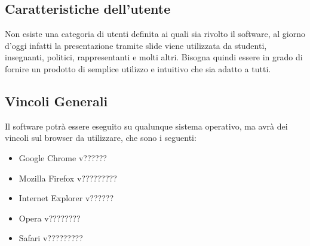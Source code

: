 \subsection{Caratteristiche dell'utente}
Non esiste una categoria di utenti definita ai quali sia rivolto il software, al giorno d'oggi infatti la presentazione tramite slide viene utilizzata da studenti, insegnanti, politici, rappresentanti e molti altri. Bisogna quindi essere in grado di fornire un prodotto di semplice utilizzo e intuitivo che sia adatto a tutti.

\subsection{Vincoli Generali}
Il software potrà essere eseguito su qualunque sistema operativo, ma avrà dei vincoli sul \gls{browser} da utilizzare, che sono i seguenti:
\begin{itemize}
	\item \gls{Google Chrome} v??????
	\item \gls{Mozilla Firefox} v?????????
	\item \gls{Internet Explorer} v??????
	\item \gls{Opera} v????????
	\item \gls{Safari} v?????????
\end{itemize}
